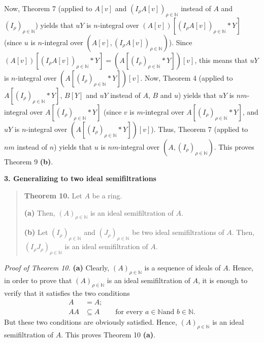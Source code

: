 \documentclass[12pt,final,notitlepage,onecolumn]{article}%
\begin{document}
Now, Theorem 7 (applied to $A\left[  v\right]  $ and $\left(  I_{\rho}A\left[
v\right]  \right)  _{\rho\in\mathbb{N}}$ instead of $A$ and $\left(  I_{\rho
}\right)  _{\rho\in\mathbb{N}}$) yields that $uY$ is $n$-integral over
$\left(  A\left[  v\right]  \right)  \left[  \left(  I_{\rho}A\left[
v\right]  \right)  _{\rho\in\mathbb{N}}\ast Y\right]  $ (since $u$ is
$n$-integral over $\left(  A\left[  v\right]  ,\left(  I_{\rho}A\left[
v\right]  \right)  _{\rho\in\mathbb{N}}\right)  $). Since $\left(  A\left[
v\right]  \right)  \left[  \left(  I_{\rho}A\left[  v\right]  \right)
_{\rho\in\mathbb{N}}\ast Y\right]  =\left(  A\left[  \left(  I_{\rho}\right)
_{\rho\in\mathbb{N}}\ast Y\right]  \right)  \left[  v\right]  $, this means
that $uY$ is $n$-integral over $\left(  A\left[  \left(  I_{\rho}\right)
_{\rho\in\mathbb{N}}\ast Y\right]  \right)  \left[  v\right]  $. Now, Theorem
4 (applied to $A\left[  \left(  I_{\rho}\right)  _{\rho\in\mathbb{N}}\ast
Y\right]  $, $B\left[  Y\right]  $ and $uY$ instead of $A$, $B$ and $u$)
yields that $uY$ is $nm$-integral over $A\left[  \left(  I_{\rho}\right)
_{\rho\in\mathbb{N}}\ast Y\right]  $ (since $v$ is $m$-integral over $A\left[
\left(  I_{\rho}\right)  _{\rho\in\mathbb{N}}\ast Y\right]  $, and $uY$ is
$n$-integral over $\left(  A\left[  \left(  I_{\rho}\right)  _{\rho
\in\mathbb{N}}\ast Y\right]  \right)  \left[  v\right]  $). Thus, Theorem 7
(applied to $nm$ instead of $n$) yields that $u$ is $nm$-integral over
$\left(  A,\left(  I_{\rho}\right)  _{\rho\in\mathbb{N}}\right)  $. This
proves Theorem 9 \textbf{(b)}.

\begin{center}
\color{blue} \textbf{3. Generalizing to two ideal semifiltrations} \color{black}
\end{center}

\begin{quote}
\textbf{Theorem 10.} Let $A$ be a ring.

\textbf{(a)} Then, $\left(  A\right)  _{\rho\in\mathbb{N}}$ is an ideal
semifiltration of $A$.

\textbf{(b)} Let $\left(  I_{\rho}\right)  _{\rho\in\mathbb{N}}$ and $\left(
J_{\rho}\right)  _{\rho\in\mathbb{N}}$ be two ideal semifiltrations of $A$.
Then, $\left(  I_{\rho}J_{\rho}\right)  _{\rho\in\mathbb{N}}$ is an ideal
semifiltration of $A$.
\end{quote}

\textit{Proof of Theorem 10.} \textbf{(a)} Clearly, $\left(  A\right)
_{\rho\in\mathbb{N}}$ is a sequence of ideals of $A$. Hence, in order to prove
that $\left(  A\right)  _{\rho\in\mathbb{N}}$ is an ideal semifiltration of
$A$, it is enough to verify that it satisfies the two conditions%
\begin{align*}
A  &  =A;\\
AA  &  \subseteq A\ \ \ \ \ \ \ \ \ \ \text{for every }a\in\mathbb{N}\text{
and }b\in\mathbb{N}.
\end{align*}
But these two conditions are obviously satisfied. Hence, $\left(  A\right)
_{\rho\in\mathbb{N}}$ is an ideal semifiltration of $A$. This proves Theorem
10 \textbf{(a)}.
\end{document}
